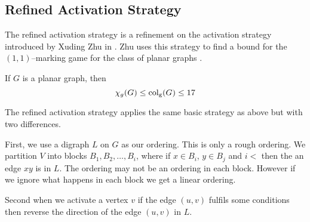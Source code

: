 \subsection{Refined Activation Strategy}
The refined activation strategy is a refinement on the activation strategy introduced by Xuding Zhu in \cite{Zhu2008}. Zhu uses this strategy to find a bound for the $(1,1)$--marking game for the class of planar graphs . 

\begin{theorem}
    If $G$ is a planar graph, then \[\chi_g(G)\leq\operatorname{col_g}(G)\leq17\]
\end{theorem}

The refined activation strategy applies the same basic strategy as above but with two differences. 

First, we use a digraph $L$ on $G$ as our ordering. This is only a rough ordering. We partition $V$ into blocks $B_1,B_2,\dots,B_i$, where if $x \in B_i$, $y \in B_j$ and $i <$ then the an edge $xy$ is in $L$. The ordering may not be an ordering in each block. However if we ignore what happens in each block we get a linear ordering.

Second when we activate a vertex $v$ if the edge $(u,v)$ fulfils some conditions then reverse the direction of the edge $(u,v)$ in $L$.

%
%
%
%


















